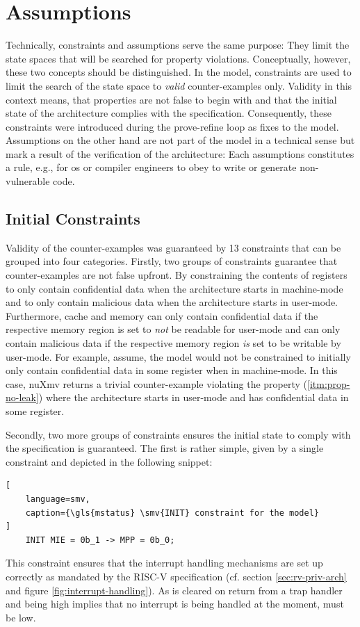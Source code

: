 \section{Assumptions}
\label{sec:assumptions}

Technically,  constraints and assumptions serve the same purpose: They limit the state spaces that will be searched for property violations.
Conceptually, however, these two concepts should be distinguished.
In the model,  constraints are used to limit the search of the state space to \textit{valid} counter-examples only.
Validity in this context means, that properties are not false to begin with and that the initial state of the architecture complies with the specification.
Consequently, these constraints were introduced during the prove-refine loop as fixes to the model.
Assumptions on the other hand are not part of the model in a technical sense but mark a result of the verification of the architecture: Each assumptions constitutes a rule, e.g., for \gls{os} or compiler engineers to obey to write or generate non-vulnerable code.

\subsection{Initial Constraints}

Validity of the counter-examples was guaranteed by 13  constraints that can be grouped into four categories.
Firstly, two groups of constraints guarantee that counter-examples are not false upfront.
By constraining the contents of registers to only contain confidential data when the architecture starts in machine-mode and to only contain malicious data when the architecture starts in user-mode.
Furthermore, cache and memory can only contain confidential data if the respective memory region is set to \textit{not} be readable for user-mode and can only contain malicious data if the respective memory region \textit{is} set to be writable by user-mode.
For example, assume, the model would not be constrained to initially only contain confidential data in some register when in machine-mode.
In this case, nuXmv returns a trivial counter-example violating the  property (\ref{itm:prop-no-leak}) where the architecture starts in user-mode and has confidential data in some register.

Secondly, two more groups of constraints ensures the initial state to comply with the specification is guaranteed.
The first is rather simple, given by a single constraint and depicted in the following snippet:
\begin{lstlisting}[
    language=smv,
    caption={\gls{mstatus} \smv{INIT} constraint for the model}
]
    INIT MIE = 0b_1 -> MPP = 0b_0;
\end{lstlisting}
This constraint ensures that the interrupt handling mechanisms are set up correctly as mandated by the RISC-V specification (cf. section \ref{sec:rv-priv-arch} and figure \ref{fig:interrupt-handling}).
As  is cleared on return from a trap handler and  being high implies that no interrupt is being handled at the moment,  must be low.


